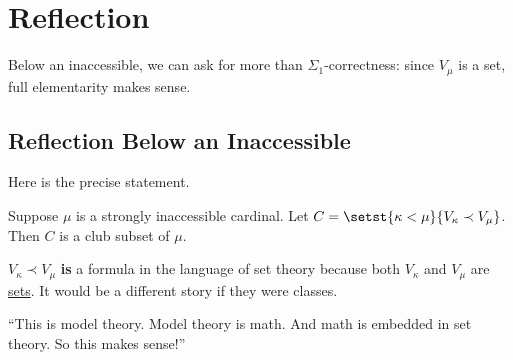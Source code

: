 \section{Reflection}

Below an inaccessible, we can ask for more than $\Sigma_1$-correctness: since $V_{\mu}$ is a set, full elementarity makes sense.

\subsection{Reflection Below an Inaccessible}

Here is the precise statement.

\begin{boxtheorem}
    Suppose $\mu$ is a strongly inaccessible cardinal. Let $C = \setst{\kappa < \mu}{V_{\kappa} \prec V_{\mu}}$. Then $C$ is a club subset of $\mu$.
\end{boxtheorem}

\begin{remark}
    $V_{\kappa} \prec V_{\mu}$ \textbf{is} a formula in the language of set theory because both $V_{\kappa}$ and $V_{\mu}$ are \underline{sets}. It would be a different story if they were classes.

    ``This is model theory. Model theory is math. And math is embedded in set theory. So this makes sense!''
\end{remark}


